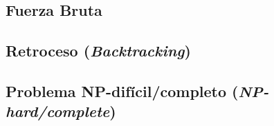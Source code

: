 \subsection{Fuerza Bruta}

\subsection{Retroceso (\emph{Backtracking})}


\subsection{Problema NP-difícil/completo (\emph{NP-hard/complete})}